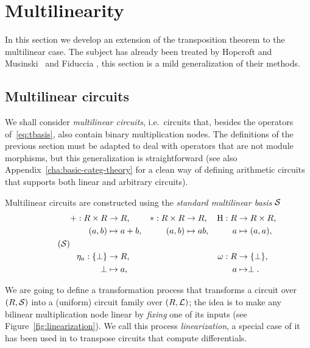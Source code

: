 

\section{Multilinearity}
\label{sec:multi}

In this section we develop an extension of the transposition theorem
to the multilinear case.  The subject has already been treated by
Hopcroft and Musinski~\cite{hopcroft+musinski73} and Fiduccia
\cite{fiduccia:phd}, this section is a mild generalization of their
methods.

\subsection{Multilinear circuits}
\label{sec:multilinear-circuits}
We shall consider \emph{multilinear
  circuits}, i.e.\ circuits that, besides the operators
of~\ref{eq:tbasis}, also contain binary multiplication nodes. The
definitions of the previous section must be adapted to deal with
operators that are not module morphisms, but this generalization is
straightforward (see also Appendix~\ref{cha:basic-categ-theory} for a
clean way of defining arithmetic circuits that supports both linear
and arbitrary circuits).

  Multilinear circuits are constructed using
the \emph{standard multilinear
  basis} $\mathcal{S}$
\begin{equation}
  \label{eq:sbasis}
  \tag{$\Sbasis$}
  \begin{aligned}
    + : R\times R &\ra R\text{,}    & * : R\times R &\ra R\text{,} &  \hub : R &\ra R\times R\text{,}\\
      (a, b) &\mapsto a+b\text{,}   &   (a, b) &\mapsto ab\text{,} &         a &\mapsto (a,a)\text{,}\\ \\
    \eta_a : \{\bom\} &\ra R\text{,}     &&& \omega : R &\ra \{\bom\}\text{,} \\
          \bom &\mapsto a\text{,} &&&          a &\mapsto \bom\text{.}
  \end{aligned}
\end{equation}


We are going to define a transformation process that transforms a
circuit over $(R,\mathcal{S})$ into a (uniform) circuit family over
$(R,\mathcal{L})$; the idea is to make any bilinear multiplication node
linear by \emph{fixing} one of its inputs (see
Figure~\ref{fig:linearization}). We call this process
\emph{linearization}, a special case of it has been used in
\cite{gashkov+gashkov05,sergeev08} to transpose circuits that compute
differentials.


